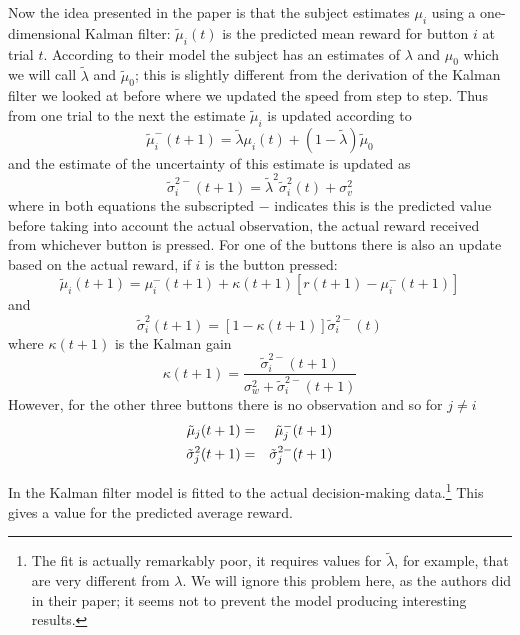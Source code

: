 \documentclass[12pt]{article}
\begin{document}
Now the idea presented in the paper is that the subject estimates
$\mu_i$ using a one-dimensional Kalman filter: $\tilde{\mu}_i(t)$ is
the predicted mean reward for button $i$ at trial $t$. According to
their model the subject has an estimates of $\lambda$ and $\mu_0$
which we will call $\tilde{\lambda}$ and $\tilde{\mu}_0$; this is
slightly different from the derivation of the Kalman filter we looked
at before where we updated the speed from step to step. Thus from one
trial to the next the estimate $\tilde{\mu}_i$ is updated according to
\begin{equation}
\tilde{\mu}_i^-(t+1)=\tilde{\lambda}\mu_i(t)+(1-\tilde{\lambda})\tilde{\mu}_0
\end{equation}
and the estimate of the uncertainty of this estimate is updated as
\begin{equation}
\tilde{\sigma}^{2-}_i(t+1)=\tilde{\lambda}^2\tilde{\sigma}^2_i(t)+\sigma^2_v
\end{equation}
where in both equations the subscripted $-$ indicates this is the
predicted value before taking into account the actual observation, the
actual reward received from whichever button is pressed. For one of
the buttons there is also an update based on the actual reward, if $i$
is the button pressed:
\begin{equation}
\tilde{\mu}_i(t+1)=\mu_i^-(t+1)+\kappa(t+1)[r(t+1)-\mu_i^-(t+1)]
\end{equation}
and
\begin{equation}
\tilde{\sigma}^{2}_i(t+1)=[1-\kappa(t+1)]\tilde{\sigma}^{2-}_i(t)
\end{equation}
where $\kappa(t+1)$ is the Kalman gain
\begin{equation}
\kappa(t+1)=\frac{\tilde{\sigma}^{2-}_i(t+1)}{\sigma^2_w+\tilde{\sigma}^{2-}_i(t+1)}
\end{equation}
However, for the other three buttons there is no observation and so for $j\not = i$
\begin{eqnarray}
\tilde{\mu}_j(t+1)&=&\tilde{\mu}^-_j(t+1)\cr
\tilde{\sigma}^{2}_j(t+1)&=&\tilde{\sigma}^{2-}_j(t+1)
\end{eqnarray}

In \citet{DawEtAl2006} the Kalman filter model is fitted to the actual
decision-making data.\footnote{The fit is actually remarkably poor, it
  requires values for $\tilde{\lambda}$, for example, that are very
  different from $\lambda$. We will ignore this problem here, as the
  authors did in their paper; it seems not to prevent the model
  producing interesting results.} This gives a value for the predicted
average reward.
\end{document}
